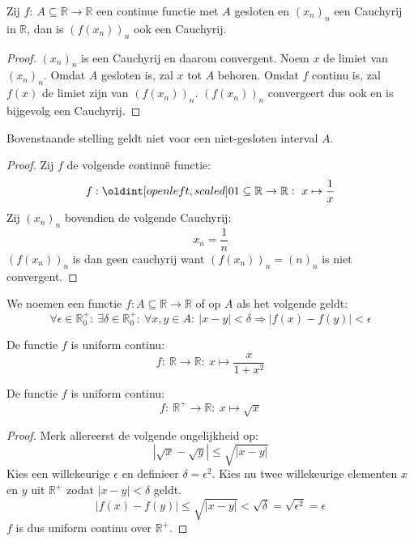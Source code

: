 \documentclass[main.tex]{subfiles}
\begin{document}
\begin{st}
  \label{st:continue-functie-over-gesloten-deel-behoudt-cauchy}
  Zij $f:\ A \subseteq \mathbb{R} \rightarrow \mathbb{R}$ een continue functie met $A$ gesloten en $(x_{n})_{n}$ een Cauchyrij in $\mathbb{R}$, dan is $(f(x_{n}))_{n}$ ook een Cauchyrij.

  \begin{proof}
    $(x_{n})_{n}$ is een Cauchyrij en daarom convergent.
    Noem $x$ de limiet van $(x_{n})_{n}$.
    Omdat $A$ gesloten is, zal $x$ tot $A$ behoren.
    Omdat $f$ continu is, zal $f(x)$ de limiet zijn van $(f(x_{n}))_{n}$.
    $(f(x_{n}))_{n}$ convergeert dus ook en is bijgevolg een Cauchyrij.
  \end{proof}
\end{st}

\begin{tvb}
  Bovenstaande stelling geldt niet voor een niet-gesloten interval $A$.

  \begin{proof}
    Zij $f$ de volgende continu\"e functie:
    \[ f: \interval[open left]{0}{1} \subseteq \mathbb{R} \rightarrow \mathbb{R}:\ x \mapsto \frac{1}{x} \]
    Zij $(x_{n})_{n}$ bovendien de volgende Cauchyrij:
    \[ x_{n} = \frac{1}{n} \]
    $(f(x_{n}))_{n}$ is dan geen cauchyrij want $(f(x_{n}))_{n} = (n)_{n}$ is niet convergent.
  \end{proof}
\end{tvb}

\begin{de}
  We noemen een functie $f: A \subseteq \mathbb{R} \rightarrow \mathbb{R}$  of  op $A$ als het volgende geldt:
  \[ \forall \epsilon \in \mathbb{R}_{0}^{+}:\ \exists \delta \in \mathbb{R}_{0}^{+}:\ \forall x,y \in A:\ |x-y| < \delta \Rightarrow |f(x)-f(y)| < \epsilon \]
\end{de}

\begin{vb}
  De functie $f$ is uniform continu:
  \[ f:\ \mathbb{R} \rightarrow \mathbb{R}:\ x \mapsto \frac{x}{1+x^{2}} \]

\end{vb}

\begin{vb}
  De functie $f$ is uniform continu:
  \[ f:\ \mathbb{R}^{+} \rightarrow \mathbb{R}:\ x \mapsto \sqrt{x} \]

  \begin{proof}
    Merk allereerst de volgende ongelijkheid op:
    \[ |\sqrt{x} - \sqrt{y}| \le \sqrt{|x-y|} \]
    Kies een willekeurige $\epsilon$ en definieer $\delta = \epsilon^{2}$.
    Kies nu twee willekeurige elementen $x$ en $y$ uit $\mathbb{R}^{+}$ zodat $|x-y|< \delta$ geldt.
    \[ |f(x) - f(y)| \le  \sqrt{|x-y|} < \sqrt{\delta} = \sqrt{\epsilon^{2}} = \epsilon \]
    $f$ is dus uniform continu over $\mathbb{R}^{+}$.
  \end{proof}
\end{vb}
\end{document}
